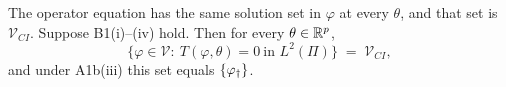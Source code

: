 %
%
%
%

\begin{corollary}\label{cor:opsol}
The operator equation has the same solution set in $\varphi$ at every $\theta$, and that set is
$\mathcal V_{CI}$.
Suppose B1(i)--(iv) hold. Then for every $\theta\in\mathbb{R}^{p}$,
\[
\big\{\varphi\in\mathcal V:\ T(\varphi,\theta)=0\ \text{in }L^{2}(\Pi)\big\}\;=\;\mathcal V_{CI},
\]
and under A1b(iii) this set equals $\{\varphi_{\dagger}\}$.
\end{corollary}

